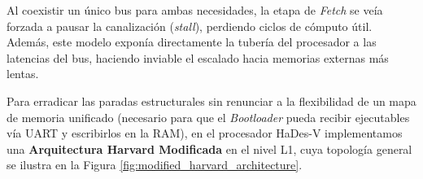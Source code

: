 \documentclass[10pt,a4paper]{article}
\begin{document}
Al coexistir un único bus para ambas necesidades, la etapa de \textit{Fetch} se veía forzada a pausar la canalización (\textit{stall}), perdiendo ciclos de cómputo 
útil. Además, este modelo exponía directamente la tubería del procesador a las latencias del bus, haciendo inviable el escalado hacia memorias externas más lentas.

Para erradicar las paradas estructurales sin renunciar a la flexibilidad de un mapa de memoria unificado (necesario para que el \textit{Bootloader} pueda recibir 
ejecutables vía UART y escribirlos en la RAM), en el procesador HaDes-V implementamos una \textbf{Arquitectura Harvard Modificada} en el nivel L1, cuya 
topología general se ilustra en la Figura \ref{fig:modified_harvard_architecture}.

\shorthandoff{<>}
\end{document}
